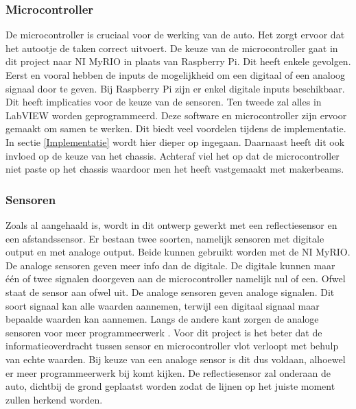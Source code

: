 \documentclass[a4paper,twoside,kulak]{kulakreport} %
\begin{document}
\subsubsection{Microcontroller}
De microcontroller is cruciaal voor de werking van de auto. Het zorgt ervoor dat het autootje de taken correct uitvoert. De keuze van de microcontroller gaat in dit project naar NI MyRIO in plaats van Raspberry Pi. Dit heeft enkele gevolgen. 
Eerst en vooral hebben de inputs de mogelijkheid om een digitaal of een analoog signaal door te geven. Bij Raspberry Pi zijn er enkel digitale inputs beschikbaar. Dit heeft implicaties voor de keuze van de sensoren. Ten tweede zal alles in LabVIEW worden geprogrammeerd. Deze software en microcontroller zijn ervoor gemaakt om samen te werken. Dit biedt veel voordelen tijdens de implementatie. In sectie \ref{Implementatie} wordt hier dieper op ingegaan. %
Daarnaast heeft dit ook invloed op de keuze van het chassis. Achteraf viel het op dat de microcontroller niet paste op het chassis waardoor men het heeft vastgemaakt met makerbeams.

\label{Microcontroller}

\subsubsection{Sensoren}
Zoals al aangehaald is, wordt in dit ontwerp gewerkt met een reflectiesensor en een afstandssensor. Er bestaan twee soorten, namelijk sensoren met digitale output en met analoge output. Beide kunnen gebruikt worden met de NI MyRIO. De analoge sensoren geven meer info dan de digitale. De digitale kunnen maar één of twee signalen doorgeven aan de microcontroller namelijk nul of een. Ofwel staat de sensor aan ofwel uit. De analoge sensoren geven analoge signalen. Dit soort signaal kan alle waarden aannemen, terwijl een digitaal signaal maar bepaalde waarden kan aannemen. Langs de andere kant zorgen de analoge sensoren voor meer programmeerwerk \cite{DigitaalOfAnaloog}. Voor dit project is het beter dat de informatieoverdracht tussen sensor en microcontroller vlot verloopt met behulp van echte waarden. Bij keuze van een analoge sensor is dit dus voldaan, alhoewel er meer programmeerwerk bij komt kijken. %
De reflectiesensor zal onderaan de auto, dichtbij de grond geplaatst worden zodat de lijnen op het juiste moment zullen herkend worden.
\end{document}
